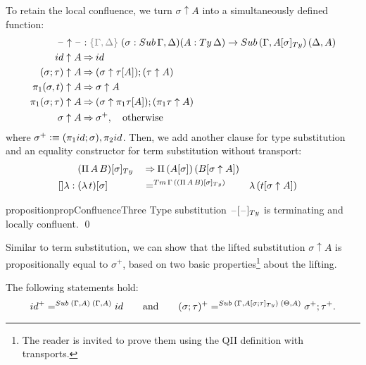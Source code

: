 \documentclass[a4paper,UKenglish,numberwithinsect,cleveref,thm-restate]{lipics-v2021}
\newcommand{\danger}{\marginpar[\hfill\dbend]{\dbend\hfill}}
\begin{document}
To retain the local confluence, we turn $\sigma \uparrow A$ into a simultaneously defined function:
\begin{alignat}{3}
  \blank\uparrow \blank & : \implicit{\Gamma, \Delta}\; (\sigma : \Sub\,\Gamma,\Delta) (A : \Ty\,\Delta) \to \Sub\,(\Gamma, \subTy{A}{\sigma})\, (\Delta, A) \label{eq:type-of-lifting} \\
\idS                \uparrow A & \reduce \idS \nonumber \\
(\sigma ; \tau)     \uparrow A & \reduce (\sigma \uparrow \sub{\tau}{A} ) ; (\tau \uparrow A) \nonumber \\
\pi_1(\sigma, t)    \uparrow A & \reduce \sigma \uparrow A \nonumber \\
\pi_1(\sigma; \tau) \uparrow A & \reduce (\sigma \uparrow \sub{\pi_1 \tau}{A}) ; (\pi_1 \tau \uparrow A)\nonumber \\
\sigma              \uparrow A & \reduce \sigma^+ , \quad \text{otherwise} \nonumber
\end{alignat}
where $\sigma^+ \defeq (\pi_1\idS ; \sigma), \pi_2\idS$.
Then, we add another clause for type substitution and an equality constructor for term substitution without transport:
\begin{alignat}{5}
                     & \subTy{(\Pi\,A\,B)}{\sigma} && \reduce \Pi\,(\sub{A}{\sigma})\,(\sub{B}{\sigma\uparrow A}) \label{eq:def-type-subst-9} \\
  \mathsf{[]\lambda} :{} & \sub{(\lambda\,t)}{\sigma} && =^{\Tm\,\Gamma\,(\subTy{(\Pi\,A\,B)}{\sigma})} && \lambda\,(\sub{t}{\sigma \uparrow A}) \nonumber
\end{alignat}


\begin{restatable}{proposition}{propConfluenceThree}\label{prop:local-confluence-3}
  Type substitution $\subTy{\blank}{\blank}$ is terminating and locally confluent.
  \qed
    \danger
\end{restatable}

Similar to term substitution, we can show that the lifted substitution $\sigma \uparrow A$ is propositionally equal to $\sigma^+$, based on two basic properties\footnote{%
  The reader is invited to prove them using the QII definition with transports.}
about the lifting.
\begin{lemma} \label{lem:lifting}
  The following statements hold:
  \[
    \idS^+ =^{\Sub\;(\Gamma, A)\;(\Gamma, A)} \idS
    \qquad\text{and}\qquad
    (\sigma; \tau)^+     =^{\Sub\;(\Gamma, \subTy{A}{\sigma; \tau})\;(\Theta, A)} \sigma^+ ; \tau^+.
  \]
\end{lemma}
\end{document}
